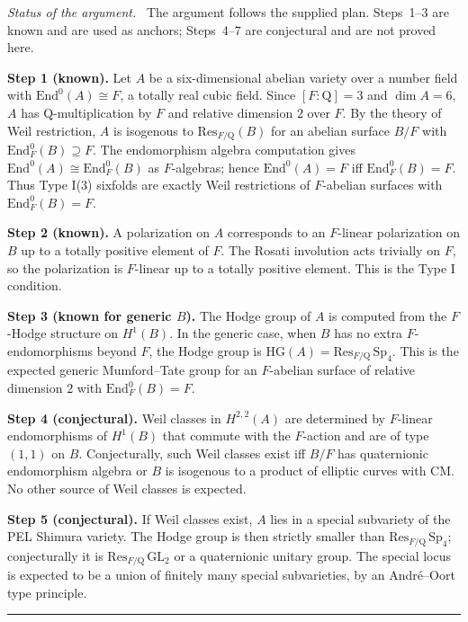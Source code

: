 \documentclass{article}
\newcommand{\mathbb}[1]{\mathrm{#1}}
\newenvironment{proof}[1][Proof]{\par\noindent\textit{#1.}\ }{\hfill\rule{1.2ex}{1.2ex}\par}
\begin{document}
\begin{proof}[Status of the argument]
The argument follows the supplied plan. Steps~1--3 are known and are used as anchors;
Steps~4--7 are conjectural and are not proved here.

\medskip
\noindent\textbf{Step 1 (known).}
Let \(A\) be a six-dimensional abelian variety over a number field with
\(\mathrm{End}^0(A) \cong F\), a totally real cubic field. Since \([F:\mathbb{Q}] = 3\)
and \(\dim A = 6\), \(A\) has \(\mathbb{Q}\)-multiplication by \(F\) and relative
dimension \(2\) over \(F\). By the theory of Weil restriction, \(A\) is isogenous to
\(\mathrm{Res}_{F/\mathbb{Q}}(B)\) for an abelian surface \(B/F\) with
\(\mathrm{End}^0_F(B) \supseteq F\). The endomorphism algebra computation gives
\(\mathrm{End}^0(A) \cong \mathrm{End}^0_F(B)\) as \(F\)-algebras; hence
\(\mathrm{End}^0(A) = F\) iff \(\mathrm{End}^0_F(B) = F\). Thus Type I(3) sixfolds are
exactly Weil restrictions of \(F\)-abelian surfaces with \(\mathrm{End}^0_F(B) = F\).

\medskip
\noindent\textbf{Step 2 (known).}
A polarization on \(A\) corresponds to an \(F\)-linear polarization on \(B\) up to a
totally positive element of \(F\). The Rosati involution acts trivially on \(F\), so
the polarization is \(F\)-linear up to a totally positive element. This is the Type I
condition.

\medskip
\noindent\textbf{Step 3 (known for generic \(B\)).}
The Hodge group of \(A\) is computed from the \(F\)-Hodge structure on \(H^1(B)\).
In the generic case, when \(B\) has no extra \(F\)-endomorphisms beyond \(F\), the
Hodge group is \(\mathrm{HG}(A) = \mathrm{Res}_{F/\mathbb{Q}}\,\mathrm{Sp}_4\). This is
the expected generic Mumford--Tate group for an \(F\)-abelian surface of relative
dimension \(2\) with \(\mathrm{End}^0_F(B) = F\).

\medskip
\noindent\textbf{Step 4 (conjectural).}
Weil classes in \(H^{2,2}(A)\) are determined by \(F\)-linear endomorphisms of
\(H^1(B)\) that commute with the \(F\)-action and are of type \((1,1)\) on \(B\).
Conjecturally, such Weil classes exist iff \(B/F\) has quaternionic endomorphism
algebra or \(B\) is isogenous to a product of elliptic curves with CM. No other source
of Weil classes is expected.

\medskip
\noindent\textbf{Step 5 (conjectural).}
If Weil classes exist, \(A\) lies in a special subvariety of the PEL Shimura variety.
The Hodge group is then strictly smaller than \(\mathrm{Res}_{F/\mathbb{Q}}\,\mathrm{Sp}_4\);
conjecturally it is \(\mathrm{Res}_{F/\mathbb{Q}}\,\mathrm{GL}_2\) or a quaternionic
unitary group. The special locus is expected to be a union of finitely many special
subvarieties, by an Andr\'e--Oort type principle.


\end{proof}
\end{document}
